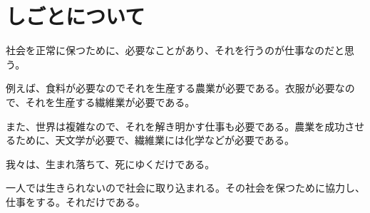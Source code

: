 \chapter{しごとについて}

社会を正常に保つために、必要なことがあり、それを行うのが仕事なのだと思う。

例えば、食料が必要なのでそれを生産する農業が必要である。衣服が必要なので、それを生産する繊維業が必要である。

また、世界は複雑なので、それを解き明かす仕事も必要である。農業を成功させるために、天文学が必要で、繊維業には化学などが必要である。

我々は、生まれ落ちて、死にゆくだけである。

一人では生きられないので社会に取り込まれる。その社会を保つために協力し、仕事をする。それだけである。

